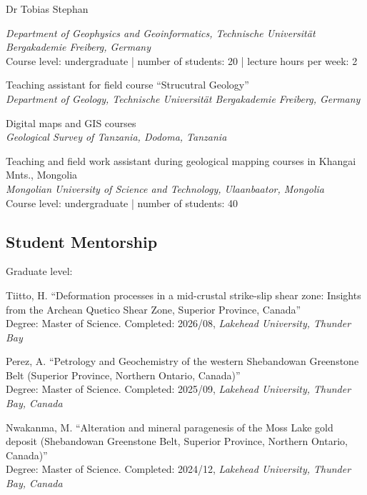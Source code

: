 \documentclass[10pt, paper=letter]{scrartcl} %
\begin{document}
\begin{cv}{\textcolor{myred}{\textsf{Dr Tobias Stephan}}}
\begin{cvlist}{}
        \textit{Department of Geophysics and Geoinformatics, Technische Universit\"at Bergakademie Freiberg, Germany}\\
        Course level: undergraduate | number of students: 20 | lecture hours per week: 2
        \item[2015--2018] Teaching assistant for field course \enquote{Strucutral Geology}\\
        \textit{Department of Geology, Technische Universit\"at Bergakademie Freiberg, Germany}
        \item[2014/01--2014/05] Digital maps and GIS courses\\
        \textit{Geological Survey of Tanzania, Dodoma, Tanzania}
        \item[2011/07--2011/09] Teaching and field work assistant during geological mapping courses in Khangai Mnts., Mongolia\\
        \textit{Mongolian University of Science and Technology, Ulaanbaator, Mongolia}\\
        Course level: undergraduate | number of students: 40
    \end{cvlist}

    \subsection{Student Mentorship}
    \begin{cvlist}{Graduate level:}
        \item[4] Tiitto, H. \enquote{Deformation processes in a mid-crustal strike-slip shear zone: Insights from the Archean Quetico Shear Zone, Superior Province, Canada}\\
        Degree: Master of Science. 
        Completed: 2026/08, \textit{Lakehead University, Thunder Bay}
        \item[3] Perez, A. \enquote{Petrology and Geochemistry of the western
            Shebandowan Greenstone Belt (Superior Province, Northern Ontario, Canada)}\\
        Degree: Master of Science.
        Completed: 2025/09, \textit{Lakehead University, Thunder Bay, Canada}
        \item[2] Nwakanma, M. \enquote{Alteration and mineral paragenesis of the Moss Lake gold deposit (Shebandowan Greenstone Belt, Superior Province, Northern Ontario, Canada)}\\
        Degree: Master of Science.
        Completed: 2024/12, \textit{Lakehead University, Thunder Bay, Canada}


\end{cvlist}
\end{cv}
\end{document}
